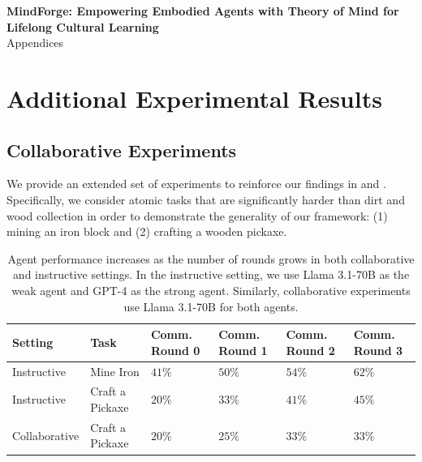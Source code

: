 \appendix

\begin{center}
\Large
\textbf{MindForge: Empowering Embodied Agents with Theory of Mind for Lifelong
Cultural Learning} \\
\vspace{0.2em}Appendices \\
\vspace{0.3em}
\end{center}

\section{Additional Experimental Results}
\label{appendix:additional-experiments}

\subsection{Collaborative Experiments}
\label{appendix:comm-experiments}

We provide an extended set of experiments to reinforce our findings in  and . Specifically, we consider atomic tasks that are significantly harder than dirt and wood collection in order to demonstrate the generality of our framework: (1) mining an iron block and (2) crafting a wooden pickaxe.

\begin{table}[htb]
    \scriptsize
  \caption{Agent performance increases as the number of rounds grows in both collaborative and instructive settings. In the instructive setting, we use Llama 3.1-70B as the weak agent and GPT-4 as the strong agent. Similarly, collaborative experiments use Llama 3.1-70B for both \collabvoyager agents.}
    {\tabcolsep=9pt
    \begin{tabularx}{\columnwidth}{@{}>{\arraybackslash}l *5{X}}
      \toprule
      \textbf{Setting} & \textbf{Task} & \textbf{Comm. Round 0} &\textbf{Comm. Round 1} & \textbf{Comm. Round 2} & \textbf{Comm. Round 3} \\ 
      \midrule
      Instructive & Mine Iron & $41\%$ & $50\%$ & $54\%$ & $62\%$ \\
      Instructive & Craft a Pickaxe & $20\%$ & $33\%$ & $41\%$ &$45\%$ \\
      \midrule
      Collaborative & Craft a Pickaxe & $20\%$ & $25\%$ & $33\%$ & $33\%$ \\
      \bottomrule
    \end{tabularx}}
    \label{table:comm-experiments-appendix}
\end{table}

